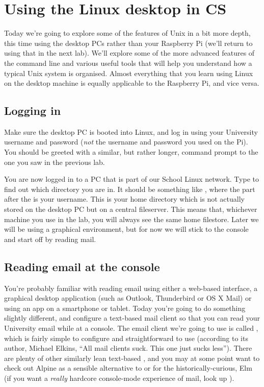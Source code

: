 \chapter{Using the Linux desktop in CS}

\minitoc


Today we're going to explore some of the features of Unix in a bit more depth, this time using the desktop PCs rather than your Raspberry Pi (we'll return to using that in the next lab). We'll explore some of the more advanced features of the command line and various useful tools that will help you understand how a typical Unix system is organised. Almost everything that you learn using Linux on the desktop machine is equally applicable to the Raspberry Pi, and vice versa. 

\section{Logging in}

 Make sure the desktop PC is booted into Linux, and log in using your University username and password (\emph{not} the username and password you used on the Pi). You should be greeted with a similar, but rather longer, command prompt to the one you saw in the previous lab.

You are now logged in to a PC that is part of our School Linux network. Type  to find out which directory you are in. It should be something like , where the part after the \ttout{/} is your username. This is your home directory which is not actually stored on the desktop PC but on a central fileserver. This means that, whichever machine you use in the lab, you will always see the same home filestore. Later we will be using a graphical environment, but for now we will stick to the console and start off by reading mail.


\section{Reading email at the console}

You're probably familiar with reading email using either a web-based interface, a graphical desktop application (such as Outlook, Thunderbird or OS X Mail) or using an app on a smartphone or tablet. Today you're going to do something slightly different, and configure a text-based mail client so that you can read your University email while at a console. The email client we're going to use is called , which is fairly simple to configure and straightforward to use (according to its author, Michael Elkins, ``All mail clients suck. This one just sucks less''). There are plenty of other similarly lean text-based , and you may at some point want to check out Alpine as a sensible alternative to  or for the historically-curious, Elm (if you want a \textit{really} hardcore console-mode experience of mail, look up ).

